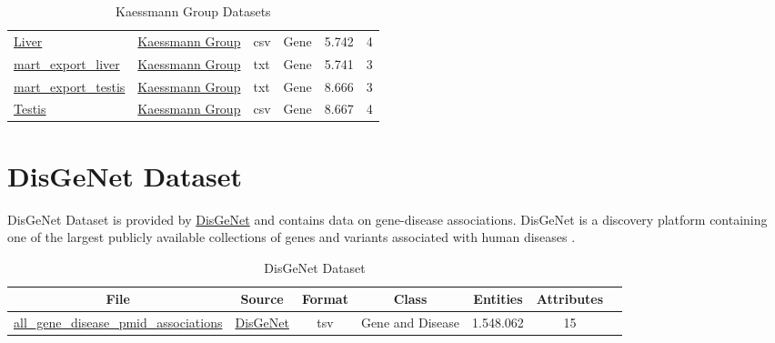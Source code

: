 \documentclass[11pt,titlepage,oneside,openany]{book}
\begin{document}
\begin{table}[!ht]
\begin{footnotesize}
\begin{tabularx}{\textwidth}{|l|l|l|l|l|l|}
	\href{https://nahorgebre.s3.amazonaws.com/Liver.csv}{Liver} & \href{https://www.zmbh.uni-heidelberg.de/kaessmann/}{Kaessmann Group}  & csv & Gene & 5.742 & 4 \\
	
	\href{https://nahorgebre.s3.amazonaws.com/mart_export_liver.txt}{mart\_export\_liver} & \href{https://www.zmbh.uni-heidelberg.de/kaessmann/}{Kaessmann Group} & txt & Gene & 5.741 & 3 \\
	
	\href{https://nahorgebre.s3.amazonaws.com/mart_export_testis.txt}{mart\_export\_testis} & \href{https://www.zmbh.uni-heidelberg.de/kaessmann/}{Kaessmann Group} & txt & Gene & 8.666 & 3 \\
	
	\href{https://nahorgebre.s3.amazonaws.com/Testis.csv}{Testis} & \href{https://www.zmbh.uni-heidelberg.de/kaessmann/}{Kaessmann Group}  & csv & Gene & 8.667 & 4 \\
  \hline
\end{tabularx}
\end{footnotesize}
\caption{Kaessmann Group Datasets}
\end{table}

\section{DisGeNet Dataset}
\label{disgenetds}
DisGeNet Dataset is provided by \href{https://www.disgenet.org/}{DisGeNet} and contains data on gene-disease associations. DisGeNet is a discovery platform containing one of the largest publicly available collections of genes and variants associated with human diseases \cite{Piero2019TheDK}.
 
\begin{table}[!ht]
\setlength\extrarowheight{2pt} %
\begin{footnotesize}
\begin{tabularx}{\textwidth}{|C|C|C|C|C|C|C|}
\hline
\textbf{File} & \textbf{Source} & \textbf{Format} & \textbf{Class} & \textbf{Entities} & \textbf{Attributes}  \\\hline

	\href{https://nahorgebre.s3.amazonaws.com/all_gene_disease_pmid_associations.tsv}{all\_gene\_disease\_pmid\_associations} & \href{https://www.disgenet.org/}{DisGeNet}  & tsv & Gene and Disease & 1.548.062 & 15 \\
  \hline
\end{tabularx}
\end{footnotesize}
\caption{DisGeNet Dataset}
\end{table}
\end{document}
